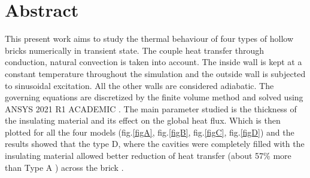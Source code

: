 \documentclass{article}
\begin{document}
\newpage
\section*{Abstract}
This present work aims to study the thermal behaviour of four types of hollow bricks numerically in transient state. The couple heat transfer through conduction, natural convection is taken into account. The inside wall is kept at a constant temperature throughout the simulation and the outside wall is subjected to sinusoidal excitation. All the other walls are considered adiabatic. The governing equations are discretized by the finite volume method and  solved using ANSYS 2021 R1 ACADEMIC . The main parameter studied is the thickness of the insulating material and its effect on the global heat flux. Which is then plotted for all the four models (fig.\ref{figA}, fig.\ref{figB}, fig.\ref{figC}, fig.\ref{figD}) and the results showed that the type D, where the cavities were completely filled with the insulating material allowed better reduction of heat transfer  (about 57\% more than Type A ) across the brick .
\end{document}
